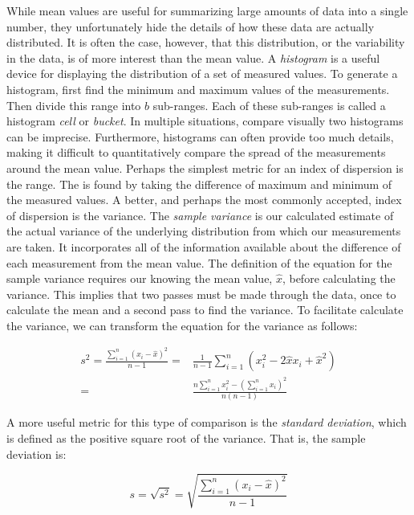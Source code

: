 \documentclass[openany, a4paper]{book}
\theoremstyle{break}
\theoremstyle{example}
\theoremstyle{note}
\theoremstyle{break}
\theoremstyle{exercise}
\begin{document}
While mean values are useful for summarizing large amounts of data into a
single number, they unfortunately hide the details of how these data are
actually distributed. It is often the case, however, that this distribution,
or the variability in the data, is of more interest than the mean value. A
\emph{histogram} is a useful device for displaying the distribution of a set of
measured values. To generate a histogram, first find the minimum and maximum
values of the measurements. Then divide this range into \(b\)
sub-ranges. Each of these sub-ranges is called a histogram \emph{cell} or \emph{bucket}. In
multiple situations, compare visually two histograms can be
imprecise. Furthermore, histograms can often provide too much details, making
it difficult to quantitatively compare the spread of the measurements around
the mean value. Perhaps the simplest metric for an index of dispersion is the
range. The is found by taking the difference of maximum and minimum of the
measured values. A better, and perhaps the most commonly accepted, index of
dispersion is the variance. The \emph{sample variance} is our calculated estimate of
the actual variance of the underlying distribution from which our
measurements are taken. It incorporates all of the information available
about the difference of each measurement from the mean value. The definition
of the equation for the sample variance requires our knowing the mean value,
\(\hat{x}\), before calculating the variance. This implies that two passes
must be made through the data, once to calculate the mean and a second pass
to find the variance. To facilitate calculate the variance, we can transform
the equation for the variance as follows:

\begin{equation}
  \begin{align*}
    s^2 = \frac{\sum^n_{i = 1}(x_i - \hat{x})^2}{n - 1} = & \frac{1}{n - 1}\sum^n_{i = 1}(x_i^2-2\hat{x}x_i + \hat{x}^2)\\
    = & \frac{n\sum^n_{i = 1}x_i^2 - (\sum^n_{i = 1}x_i)^2}{n(n-1)}
  \end{align*}
\end{equation}

A more useful metric for this type of comparison is the \emph{standard deviation},
which is defined as the positive square root of the variance. That is, the
sample deviation is:

\begin{equation}
  s = \sqrt{s^2} = \sqrt{\frac{\sum_{i=1}^n (x_i - \hat{x})^2}{n - 1}}
\end{equation}
\end{document}
